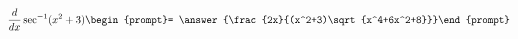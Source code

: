 \documentclass{ximera}
\author{Steven Gubkin\and Nela Lakos}
\begin{document}
\begin{exercise}

\[
\frac{d}{dx} \sec^{-1}(x^2+3) \begin{prompt}= \answer{\frac{2x}{(x^2+3)\sqrt{x^4+6x^2+8}}}\end{prompt}
\]



\end{exercise}
\end{document}
